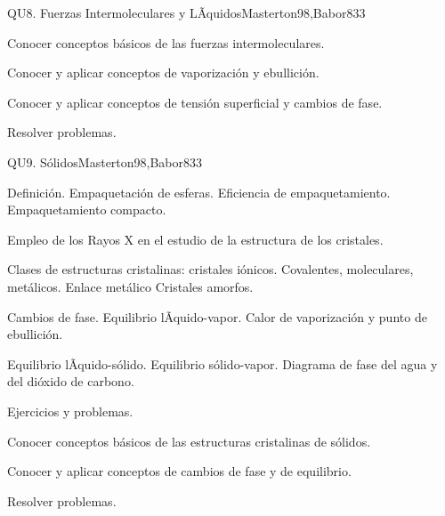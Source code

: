 \begin{syllabus}
\begin{unit}{QU8. Fuerzas Intermoleculares y LÃ­quidos}{Masterton98,Babor83}{3}
   \begin{unitgoals}
      \item Conocer conceptos básicos de las fuerzas intermoleculares.
      \item Conocer y aplicar conceptos de vaporización y ebullición.
      \item Conocer y aplicar conceptos de tensión superficial y cambios de fase.
      \item Resolver problemas.
   \end{unitgoals}
\end{unit}

\begin{unit}{QU9. Sólidos}{Masterton98,Babor83}{3}
\begin{topics}
      \item Definición. Empaquetación de esferas. Eficiencia de empaquetamiento. Empaquetamiento compacto.
      \item Empleo de los Rayos X en el estudio de la estructura de los cristales.
      \item Clases de estructuras cristalinas: cristales iónicos. Covalentes, moleculares, metálicos. Enlace metálico Cristales amorfos.
      \item Cambios de fase. Equilibrio lÃ­quido-vapor. Calor de vaporización y punto de ebullición.
      \item Equilibrio lÃ­quido-sólido. Equilibrio sólido-vapor. Diagrama de fase  del agua y del dióxido de carbono.
      \item Ejercicios y problemas.
    \end{topics}

   \begin{unitgoals}
      \item Conocer conceptos básicos de las estructuras cristalinas de sólidos.
      \item Conocer y aplicar conceptos de cambios de fase y de equilibrio.
      \item Resolver problemas.
   \end{unitgoals}
\end{unit}


\end{syllabus}
